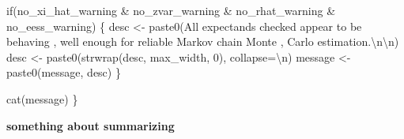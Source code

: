 \documentclass[
  letterpaper,
  DIV=11,
  numbers=noendperiod]{scrartcl}
\newenvironment{Shaded}{\begin{snugshade}}{\end{snugshade}}
\newcommand{\AttributeTok}[1]{\textcolor[rgb]{0.40,0.45,0.13}{#1}}
\newcommand{\ControlFlowTok}[1]{\textcolor[rgb]{0.00,0.23,0.31}{#1}}
\newcommand{\DecValTok}[1]{\textcolor[rgb]{0.68,0.00,0.00}{#1}}
\newcommand{\FunctionTok}[1]{\textcolor[rgb]{0.28,0.35,0.67}{#1}}
\newcommand{\NormalTok}[1]{\textcolor[rgb]{0.00,0.23,0.31}{#1}}
\newcommand{\OtherTok}[1]{\textcolor[rgb]{0.00,0.23,0.31}{#1}}
\newcommand{\SpecialCharTok}[1]{\textcolor[rgb]{0.37,0.37,0.37}{#1}}
\newcommand{\StringTok}[1]{\textcolor[rgb]{0.13,0.47,0.30}{#1}}
\begin{document}
\begin{Shaded}
\begin{Highlighting}[]
  \ControlFlowTok{if}\NormalTok{(no\_xi\_hat\_warning }\SpecialCharTok{\&}\NormalTok{ no\_zvar\_warning }\SpecialCharTok{\&} 
\NormalTok{     no\_rhat\_warning }\SpecialCharTok{\&}\NormalTok{ no\_eess\_warning) \{}
\NormalTok{    desc }\OtherTok{\textless{}{-}} \FunctionTok{paste0}\NormalTok{(}\StringTok{\textquotesingle{}All expectands checked appear to be behaving \textquotesingle{}}\NormalTok{,}
                   \StringTok{\textquotesingle{}well enough for reliable Markov chain Monte \textquotesingle{}}\NormalTok{,}
                   \StringTok{\textquotesingle{}Carlo estimation.}\SpecialCharTok{\textbackslash{}n\textbackslash{}n}\StringTok{\textquotesingle{}}\NormalTok{)}
\NormalTok{    desc }\OtherTok{\textless{}{-}} \FunctionTok{paste0}\NormalTok{(}\FunctionTok{strwrap}\NormalTok{(desc, max\_width, }\DecValTok{0}\NormalTok{), }\AttributeTok{collapse=}\StringTok{\textquotesingle{}}\SpecialCharTok{\textbackslash{}n}\StringTok{\textquotesingle{}}\NormalTok{)}
\NormalTok{    message }\OtherTok{\textless{}{-}} \FunctionTok{paste0}\NormalTok{(message, desc)}
\NormalTok{  \}}

  \FunctionTok{cat}\NormalTok{(message)}
\NormalTok{\}}
\end{Highlighting}
\end{Shaded}

\textbf{something about summarizing}
\end{document}
